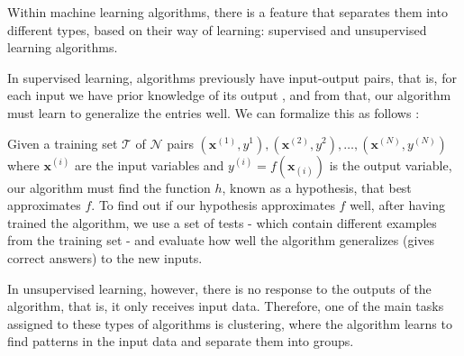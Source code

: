 Within machine learning algorithms, there is a feature that separates them into different types, based on their way of learning: supervised and unsupervised learning algorithms.

In supervised learning, algorithms previously have input-output pairs, that is, for each input we have prior knowledge of its output \cite{russell2016}, and from that, our algorithm must learn to generalize the entries well. We can formalize this as follows \cite{russell2016}:

Given a training set $\mathcal{T}$ of $\mathcal{N}$ pairs $(\mathbf{x}^{(1)},y^1),(\mathbf{x}^{(2)},y^2),\dots,(\mathbf{x}^{(N)},y^{(N)})$ where $\mathbf{x}^{(i)}$ are the input variables and $y^{(i)}=f(\mathbf{x}_{(i)})$ is the output variable, our algorithm must find the function $h$, known as a hypothesis, that best approximates $f$. To find out if our hypothesis approximates $f$ well, after having trained the algorithm, we use a set of tests - which contain different examples from the training set - and evaluate how well the algorithm generalizes (gives correct answers) to the new inputs.

In unsupervised learning, however, there is no response to the outputs of the algorithm, that is, it only receives input data. Therefore, one of the main tasks assigned to these types of algorithms is clustering, where the algorithm learns to find patterns in the input data and separate them into groups.





%
